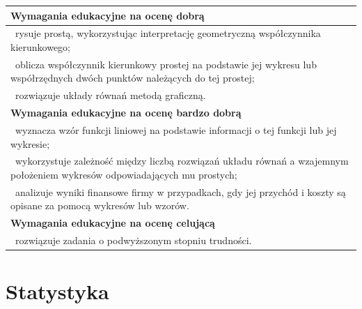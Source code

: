 \documentclass[12pt,a4paper]{article}
\begin{document}
\begin{longtable}{|p{16cm}|}
		\textbf{Wymagania edukacyjne na ocenę dobrą} \\ \hline
		
		\textbullet\ rysuje prostą, wykorzystując interpretację geometryczną współczynnika kierunkowego; \\
		
		\textbullet\ oblicza współczynnik kierunkowy prostej na podstawie jej wykresu lub współrzędnych dwóch punktów należących do tej prostej; \\
		
		\textbullet\ rozwiązuje układy równań metodą graficzną. \\ \hline
		
		\textbf{Wymagania edukacyjne na ocenę bardzo dobrą} \\ \hline
		
		\textbullet\ wyznacza wzór funkcji liniowej na podstawie informacji o tej funkcji lub jej wykresie; \\
		
		\textbullet\ wykorzystuje zależność między liczbą rozwiązań układu równań a wzajemnym położeniem wykresów odpowiadających mu prostych; \\
		
		\textbullet\ analizuje wyniki finansowe firmy w przypadkach, gdy jej przychód i koszty są opisane za pomocą wykresów lub wzorów. \\ \hline
		
		\textbf{Wymagania edukacyjne na ocenę celującą} \\ \hline
		
		\textbullet\ rozwiązuje zadania o podwyższonym stopniu trudności. \\ \hline
		
	\end{longtable}
	
	\section{Statystyka}
	
\end{document}
